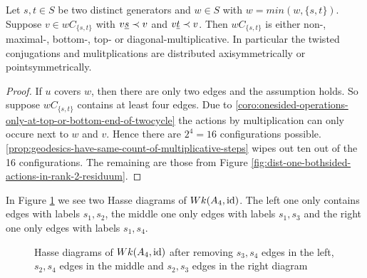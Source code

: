 \begin{lemm}
	Let $s,t \in S$ be two distinct generators and $w \in S$ with $w = min(w,\{s,t\})$. Suppose $v \in wC_{\{s,t\}}$ with $v \underline{s} \prec v$ and $v \underline{t} \prec v$. Then $wC_{\{s,t\}}$ is either non-, maximal-, bottom-, top- or diagonal-multiplicative. In particular the twisted conjugations and mulitplications are distributed axisymmetrically or pointsymmetrically.

	\begin{proof}
		If $u$ covers $w$, then there are only two edges and the assumption holds. So suppose $wC_{\{s,t\}}$ contains at least four edges. Due to \ref{coro:onesided-operations-only-at-top-or-bottom-end-of-twocycle} the actions by multiplication can only occure next to $w$ and $v$. Hence there are $2^4 = 16$ configurations possible. \ref{prop:geodesics-have-same-count-of-multiplicative-steps} wipes out ten out of the 16 configurations. The remaining are those from Figure \ref{fig:dist-one-bothsided-actions-in-rank-2-residuum}.
	\end{proof}
\end{lemm}

\begin{exam}
	In Figure \ref{fig:a4_s1s3-and-a4_s2s4} we see two Hasse diagrams of $Wk(A_4, \operatorname{id})$. The left one only contains edges with labels $s_1,s_2$, the middle one only edges with labels $s_1,s_3$ and the right one only edges with labels $s_1,s_4$.
	\begin{figure}[ht]
		\centering
		
		\quad \quad
		
		\quad \quad
		
		\caption{Hasse diagrams of $Wk(A_4, \operatorname{id})$ after removing $s_3,s_4$ edges in the left, $s_2,s_4$ edges in the middle and $s_2,s_3$ edges in the right diagram}
		\label{fig:a4_s1s3-and-a4_s2s4}
	\end{figure}
\end{exam}

